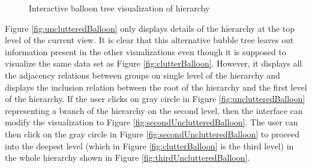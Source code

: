 \begin{figure}[htb]
\centering
{}
\caption{Interactive balloon tree visualization of hierarchy}
\label{fig:interactiveBalloon}
\end{figure}

Figure \ref{fig:unclutteredBalloon} only displays details of the hierarchy at the top level of the current view. It is clear that this alternative bubble tree leaves out information present in the other visualizations even though it is supposed to visualize the same data set as Figure \ref{fig:clutterBalloon}. However, it displays all the adjacency relations between groups on single level of the hierarchy and displays the inclusion relation between the root of the hierarchy and the first level of the hierarchy. If the user clicks on gray circle in Figure \ref{fig:unclutteredBalloon} representing a branch of the hierarchy on the second level, then the interface can modify the visualization to Figure \ref{fig:secondUnclutteredBalloon}. The user can then click on the gray circle in Figure \ref{fig:secondUnclutteredBalloon} to proceed into the deepest level (which in Figure \ref{fig:clutterBalloon} is the third level) in the whole hierarchy shown in Figure \ref{fig:thirdUnclutteredBalloon}. 

